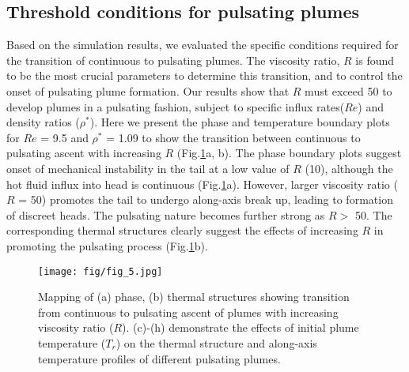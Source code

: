 \documentclass[12pt]{article}
\begin{document}
{\subsection{Threshold conditions for pulsating plumes}
\label{sec:threshold} 
    
          
Based on the simulation results, we evaluated the specific conditions required for the transition of continuous to pulsating plumes. The viscosity ratio, $R$ is found to be the most crucial parameters to determine this transition, and to control the onset of pulsating plume formation. Our results show that $R$ must exceed 50 to develop plumes in a pulsating fashion, subject to specific influx rates($Re$) and density 
ratios ($\rho^*$). Here we present the phase and temperature boundary plots for $Re$ = 9.5 and 
$\rho^*$ = 1.09 to show the transition between continuous to pulsating ascent with 
increasing $R$ (Fig.\ref{fig:fig5}a, b). The phase boundary plots suggest onset of 
mechanical instability in the tail at a low value of $R$ (10), although the hot fluid influx into head is continuous (Fig.\ref{fig:fig5}a). However, larger viscosity ratio ($R$ = 50) promotes the tail to undergo along-axis break up, leading to formation of discreet heads. The pulsating nature becomes further strong as $R>$ 50. The corresponding thermal structures clearly suggest the effects of increasing $R$ in promoting the pulsating process (Fig.\ref{fig:fig5}b).          


\begin{figure}[!htb]
 \begin{center}
{\texttt{[image: fig/fig\_5.jpg]} }
\caption{ \small{Mapping of (a) phase, (b) thermal structures showing transition from continuous to pulsating ascent of plumes with increasing viscosity ratio ($R$). (c)-(h) demonstrate the effects of initial plume temperature ($T_r$) on the thermal structure and along-axis temperature profiles of different pulsating plumes.  }}
\label{fig:fig5}
 \end{center}
\end{figure}


}
\end{document}
